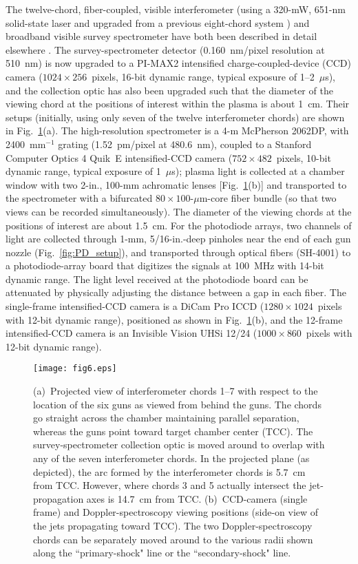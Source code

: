 \documentclass[journal]{IEEEtran}
\begin{document}
The twelve-chord, fiber-coupled, visible interferometer (using a 320-mW, 651-nm
solid-state laser and upgraded from a previous
eight-chord system \cite{merritt12a,merritt12b}) and broadband visible survey spectrometer
have both been described in detail elsewhere \cite{hsu12pop, hsu15jpp}.  The
survey-spectrometer detector (0.160~nm/pixel resolution at 510~nm)
is now upgraded to a PI-MAX2 intensified charge-coupled-device
(CCD) camera ($1024\times256$~pixels, 16-bit dynamic range, typical exposure of 1--2~$\mu$s),
and the collection
optic has also been upgraded such that the diameter of the viewing chord at the positions
of interest within the plasma is about 1~cm.  Their setups (initially,
using only seven of the twelve interferometer chords) are shown in Fig.~\ref{fig:int_spect_setup}(a).
The high-resolution spectrometer is a 4-m McPherson 2062DP, with 2400~mm$^{-1}$ grating
(1.52~pm/pixel at 480.6~nm),
coupled to a Stanford Computer Optics 4 Quik~E intensified-CCD camera
($752\times 482$~pixels, 10-bit dynamic range, typical exposure of 1~$\mu$s); plasma light is
collected at a chamber window with two 2-in., 100-mm achromatic lenses 
[Fig.~\ref{fig:int_spect_setup}(b)] and transported
to the spectrometer with a bifurcated $80\times100$-$\mu$m-core fiber bundle (so that
two views can be recorded simultaneously).  The diameter of the viewing chords at the
positions of interest are about 1.5~cm.
For the photodiode arrays, two channels of light are collected through 1-mm, 5/16-in.-deep pinholes 
near the end of each gun nozzle (Fig.~\ref{fig:PD_setup}),
and transported through optical fibers (SH-4001) to a photodiode-array board that
digitizes the signals at 100~MHz with 14-bit dynamic range.  The light level received
at the photodiode board
can be attenuated by physically adjusting the distance between a gap in each fiber.
The single-frame intensified-CCD camera is a DiCam Pro ICCD ($1280\times 
1024$~pixels with 12-bit dynamic range), positioned as shown in Fig.~\ref{fig:int_spect_setup}(b),
and the 12-frame intensified-CCD camera is an Invisible Vision UHSi 12/24
($1000\times 860$~pixels with 12-bit dynamic range).

\begin{figure}[!tb]
\centering
\texttt{[image: fig6.eps]}
\caption{(a)~Projected view of interferometer chords 1--7 with respect to
the location of the six guns as viewed from behind the guns.  The chords go straight across the
chamber maintaining parallel separation, whereas the guns point toward target chamber center (TCC)\@.  The survey-spectrometer collection
optic is moved around to overlap with any of the seven interferometer chords.  In the projected
plane (as depicted), the arc formed by the interferometer chords is 5.7~cm from TCC\@.
However, where chords 3 and 5 actually
intersect the jet-propagation axes is 14.7~cm from TCC\@. (b)~CCD-camera (single frame) and Doppler-spectroscopy viewing positions 
(side-on view of the jets propagating toward TCC\@).  The two 
Doppler-spectroscopy chords can be separately moved around to the various radii shown along the
``primary-shock" line or the ``secondary-shock" line.}
\label{fig:int_spect_setup}
\end{figure}
\end{document}
